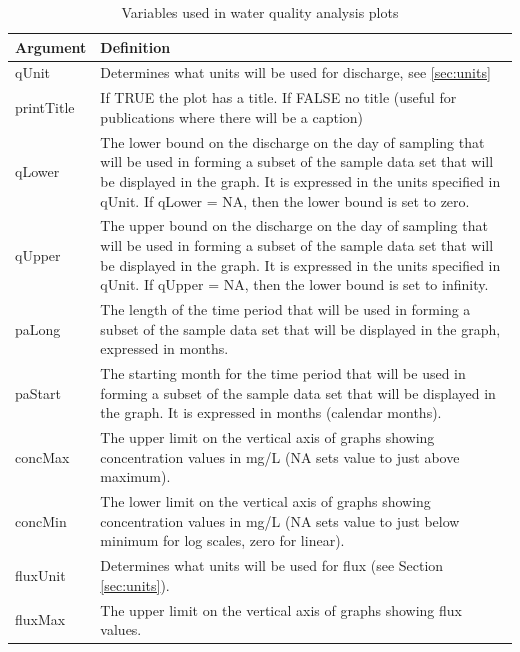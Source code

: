 \documentclass[a4paper,11pt]{article}
\begin{document}
\begin{table}[ht]
\caption{Variables used in water quality analysis plots  \label{tab:wqVariables}}
\begin{tabularx}{\textwidth}{lX}
\hline
  \textbf{Argument} & \textbf{Definition} \\
\hline
qUnit & Determines what units will be used for discharge, see \ref{sec:units}\\
printTitle & If TRUE the plot has a title.  If FALSE no title (useful for publications where there will be a caption)\\
qLower & The lower bound on the discharge on the day of sampling that will be used in forming a subset of the sample data set that will be displayed in the graph.  It is expressed in the units specified in qUnit.  If qLower = NA, then the lower bound is set to zero.\\
qUpper & The upper bound on the discharge on the day of sampling that will be used in forming a subset of the sample data set that will be displayed in the graph.  It is expressed in the units specified in qUnit.  If qUpper = NA, then the lower bound is set to infinity.\\
paLong & The length of the time period that will be used in forming a subset of the sample data set that will be displayed in the graph, expressed in months. \\ 
paStart & The starting month for the time period that will be used in forming a subset of the sample data set that will be displayed in the graph.  It is expressed in months (calendar months).\\
concMax & The upper limit on the vertical axis of graphs showing concentration values in mg/L (NA sets value to just above maximum).  \\
concMin & The lower limit on the vertical axis of graphs showing concentration values in mg/L (NA sets value to just below minimum for log scales, zero for linear).  \\
fluxUnit & Determines what units will be used for flux (see Section \ref{sec:units}).\\
fluxMax & The upper limit on the vertical axis of graphs showing flux values.  \\
\hline
\end{tabularx}

\end{table}

\FloatBarrier
\clearpage


\end{document}
